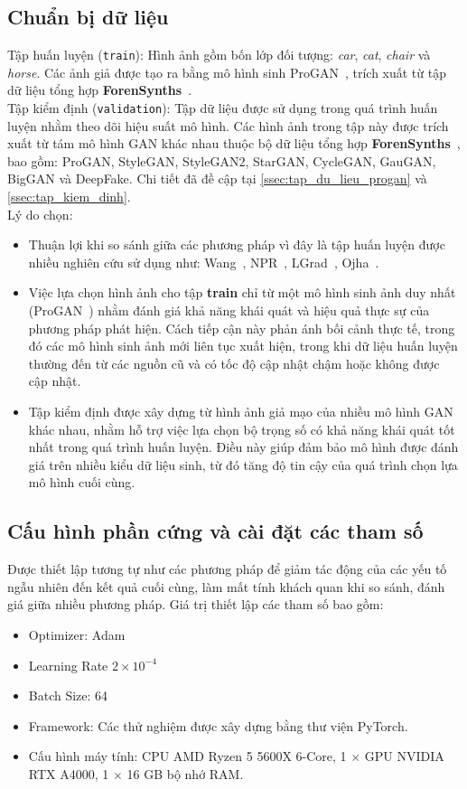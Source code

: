 \subsection{Chuẩn bị dữ liệu}
%
Tập huấn luyện (\texttt{train}): Hình ảnh gồm bốn lớp đối tượng: \textit{car}, \textit{cat}, \textit{chair} và \textit{horse}. Các ảnh giả được tạo ra bằng mô hình sinh ProGAN~\cite{karras2018progressive}, trích xuất từ tập dữ liệu tổng hợp \textbf{ForenSynths}~\cite{Wang2019CNNGeneratedIA}.\\
%
Tập kiểm định (\texttt{validation}):
%
Tập dữ liệu được sử dụng trong quá trình huấn luyện nhằm theo dõi hiệu suất mô hình. Các hình ảnh trong tập này được trích xuất từ tám mô hình GAN khác nhau thuộc bộ dữ liệu tổng hợp \textbf{ForenSynths}~\cite{Wang2019CNNGeneratedIA}, bao gồm: ProGAN, StyleGAN, StyleGAN2, StarGAN, CycleGAN, GauGAN, BigGAN và DeepFake.
%
Chi tiết đã đề cập tại \ref{ssec:tap_du_lieu_progan} và \ref{ssec:tap_kiem_dinh}. \\
%
Lý do chọn:
\begin{itemize}
	\item Thuận lợi khi so sánh giữa các phương pháp vì đây là tập huấn luyện được nhiều nghiên cứu sử dụng như: Wang~\cite{Wang2019CNNGeneratedIA}, NPR~\cite{Tan2023RethinkingTU}, LGrad~\cite{Tan2023LearningOG}, Ojha~\cite{Ojha2023TowardsUF}. 
	\item Việc lựa chọn hình ảnh cho tập \textbf{train} chỉ từ một mô hình sinh ảnh duy nhất (ProGAN~\cite{karras2018progressive}) nhằm đánh giá khả năng khái quát và hiệu quả thực sự của phương pháp phát hiện. Cách tiếp cận này phản ánh bối cảnh thực tế, trong đó các mô hình sinh ảnh mới liên tục xuất hiện, trong khi dữ liệu huấn luyện thường đến từ các nguồn cũ và có tốc độ cập nhật chậm hoặc không được cập nhật.
	\item Tập kiểm định được xây dựng từ hình ảnh giả mạo của nhiều mô hình GAN khác nhau, nhằm hỗ trợ việc lựa chọn bộ trọng số có khả năng khái quát tốt nhất trong quá trình huấn luyện. Điều này giúp đảm bảo mô hình được đánh giá trên nhiều kiểu dữ liệu sinh, từ đó tăng độ tin cậy của quá trình chọn lựa mô hình cuối cùng.
\end{itemize}
%
\subsection{Cấu hình phần cứng và cài đặt các tham số} Được thiết lập tương tự như các phương pháp \cite{Wang2019CNNGeneratedIA, Tan2023RethinkingTU,Tan2023LearningOG} để giảm tác động của các yếu tố ngẫu nhiên đến kết quả cuối cùng, làm mất tính khách quan khi so sánh, đánh giá giữa nhiều phương pháp. Giá trị thiết lập các tham số bao gồm:
	\begin{itemize}
		\item Optimizer: Adam
		\item Learning Rate $2 \times 10^{-4}$
		\item Batch Size: 64
		\item Framework: Các thử nghiệm được xây dựng bằng thư viện PyTorch.
		\item Cấu hình máy tính: CPU AMD Ryzen 5 5600X 6-Core, 1 $\times$ GPU NVIDIA RTX A4000, 1 $\times$ 16 GB bộ nhớ RAM.
	\end{itemize}

